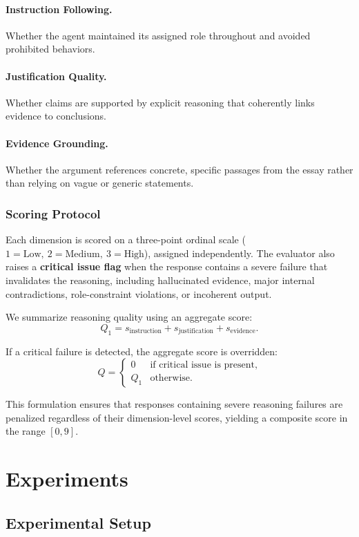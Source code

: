 \documentclass[11pt]{article}
\begin{document}
\paragraph{Instruction Following.} Whether the agent maintained its assigned role throughout and avoided prohibited behaviors.
\paragraph{Justification Quality.} Whether claims are supported by explicit reasoning that coherently links evidence to conclusions.
\paragraph{Evidence Grounding.} Whether the argument references concrete, specific passages from the essay rather than relying on vague or generic statements.

\subsubsection{Scoring Protocol}

Each dimension is scored on a three-point ordinal scale ($1 = \text{Low},\ 2 = \text{Medium},\ 3 = \text{High}$), assigned independently. The evaluator also raises a \textbf{critical issue flag} when the response contains a severe failure that invalidates the reasoning, including hallucinated evidence, major internal contradictions, role-constraint violations, or incoherent output.

We summarize reasoning quality using an aggregate score:
\[
Q_1 = s_{\text{instruction}} + s_{\text{justification}} + s_{\text{evidence}}.
\]

If a critical failure is detected, the aggregate score is overridden:
\[
Q =
\begin{cases}
0 & \text{if critical issue is present}, \\
Q_1 & \text{otherwise}.
\end{cases}
\]

This formulation ensures that responses containing severe reasoning failures are penalized regardless of their dimension-level scores, yielding a composite score in the range $[0, 9]$.

\section{Experiments}

\subsection{Experimental Setup}
\end{document}

